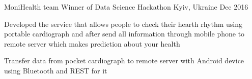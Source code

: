 \begin{cventries}  
  \cventry
    {MoniHealth team} %
    {Winner of Data Science Hackathon} %
    {Kyiv, Ukraine} %
    {Dec 2016} %
    {
      \begin{cvitems} %
        \item { Developed the service that allows people to check their hearth rhythm using portable cardiograph and after send all information through mobile phone to remote server which makes prediction about your health}
        \item { Transfer data from pocket cardiograph to remote server with Android device using Bluetooth and REST for it}
      \end{cvitems}
    }
\end{cventries}
